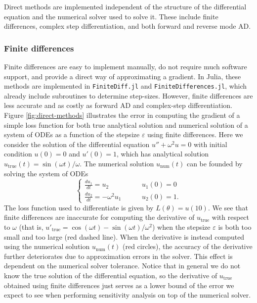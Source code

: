 Direct methods are implemented independent of the structure of the differential equation and the numerical solver used to solve it. 
These include finite differences, complex step differentiation, and both forward and reverse mode AD. 

\subsubsection{Finite differences}
\label{section:software-finite-differences}

Finite differences are easy to implement manually, do not require much software support, and provide a direct way of approximating a gradient. 
In Julia, these methods are implemented in \texttt{FiniteDiff.jl} and \texttt{FiniteDifferences.jl}, which already include subroutines to determine step-sizes.
However, finite differences are less accurate and as costly as forward AD \cite{Griewank_1989} and complex-step differentiation. 
Figure \ref{fig:direct-methods} illustrates the error in computing the gradient of a simple loss function for both true analytical solution and numerical solution of a system of ODEs as a function of the stepsize $\varepsilon$ using finite differences.
Here we consider the solution of the differential equation $u'' + \omega^2 u = 0$ with initial condition $u(0)=0$ and $u'(0)=1$, which has analytical solution $u_\text{true}(t) = \sin(\omega t) / \omega$.
The numerical solution $u_\text{num}(t)$ can be founded by solving the system of ODEs
\begin{equation}
\begin{cases}
    \frac{du_1}{dt} = u_2 \,   & \qquad u_1(0) = 0 \\
    \frac{du_2}{dt} = - \omega^2 u_1 \,   & \qquad u_2(0) = 1.
    \label{eq:example-ode-direct-methods}
\end{cases}
\end{equation}
The loss function used to differentiate is given by $L(\theta) = u(10)$.
We see that finite differences are inaccurate for computing the derivative of $u_\text{true}$ with respect to $\omega$ (that is, $u'_\text{true} = \cos(\omega t) - \sin (\omega t) / \omega^2$) when the stepsize $\varepsilon$ is both too small and too large (red dashed line).
When the derivative is instead computed using the numerical solution $u_\text{num}(t)$ (red circles), the accuracy of the derivative further deteriorates due to approximation errors in the solver. 
This effect is dependent on the numerical solver tolerance.
Notice that in general we do not know the true solution of the differential equation, so the derivative of $u_\text{true}$ obtained using finite differences just serves as a lower bound of the error we expect to see when performing sensitivity analysis on top of the numerical solver. 

